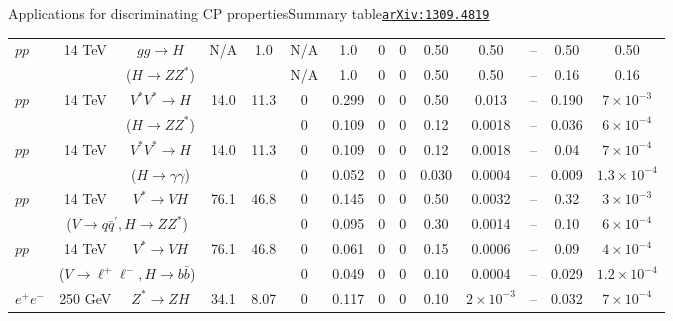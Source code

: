 \documentclass[usenames,dvipsnames,svgnames,table]{beamer}
\newcommand{\arxiv}[1]{\href{http://arxiv.org/abs/#1}{\nolinkurl{arXiv:#1}}}
\newcommand{\snowmass}{\arxiv{1309.4819}}
\begin{document}
\begin{frame}{Applications for discriminating CP properties}{Summary table\hfill\snowmass}
{\begin{tabular}{|lcccc || cccccc || cccc |}
\hline
\hline
$pp$ & 14 TeV &  $gg\to H$                        & N/A        &  1.0       &   N/A & 1.0 &  0 & 0 & 0.50 & 0.50 & \multicolumn{2}{c}{ --  } &  0.50 & 0.50 \\
          &               &   ($H\to ZZ^*$)              &            &               &  N/A & 1.0 &  0 & 0  & 0.50 & 0.50 & \multicolumn{2}{c}{ --  } & 0.16 & 0.16 \\
\hline
$pp$ & 14 TeV &  $V^*V^*\to H$                & 14.0     &  11.3    &  0 & 0.299      &  0 & 0 & 0.50 & 0.013  & \multicolumn{2}{c}{ --  } & 0.190 &$7\!\times\!10^{-3}$ \\
          &               &   ($H\to ZZ^*$)                &            &              &   0 & 0.109 &  0 & 0  & 0.12 & 0.0018 & \multicolumn{2}{c}{ --  } & 0.036 & $6\!\times\!10^{-4}$ \\
\hline
$pp$ & 14 TeV &  $V^*V^*\to H$                            & 14.0     &  11.3       & 0 & 0.109 &  0 & 0  & 0.12 & 0.0018 & \multicolumn{2}{c}{ --  }  & 0.04 & $7\!\times\!10^{-4}$  \\
          &               &   ($H\to\gamma\gamma$)             &           &                & 0 & 0.052 &  0 & 0  & 0.030 & 0.0004 & \multicolumn{2}{c}{ --  } &  0.009 & $1.3\!\times\!10^{-4}$\\
\hline
$pp$ & 14 TeV &  $V^*\to VH$                    &  76.1     &  46.8      & 0 & 0.145   & 0 & 0  & 0.50 & 0.0032  & \multicolumn{2}{c}{ --  }  & 0.32 & $3\!\times\!10^{-3}$  \\
          &              \multicolumn{2}{c}{($V\to q\bar{q}^\prime, H\to ZZ^*$)}
                                                                            &           &                & 0  & 0.095      &  0 & 0  & 0.30 & 0.0014 & \multicolumn{2}{c}{ --  } & 0.10 & $6\!\times\!10^{-4}$  \\
\hline
%
$pp$ & 14 TeV &  $V^*\to VH$                                                                   &  76.1   &  46.8      & 0 & 0.061 & 0 & 0  & 0.15 & 0.0006 & \multicolumn{2}{c}{ --  }  & 0.09  & $4\!\times\!10^{-4}$  \\
         &            \multicolumn{2}{c}{($V\to \ell^+\ell^-, H\to b\bar{b}$)}   &           &                 &  0 & 0.049 &  0 & 0  & 0.10 &  0.0004 & \multicolumn{2}{c}{ --  } & 0.029 & $1.2\!\times\!10^{-4}$  \\
\hline\hline
$e^+e^-$ & 250 GeV & $Z^*\to ZH$ & 34.1 &  8.07 & 0  & 0.117 & 0 & 0  & 0.10 & $2\times10^{-3}$ & \multicolumn{2}{c}{ --  } & 0.032 & $7\!\times\!10^{-4}$ \\

\end{tabular}}
\end{frame}
\end{document}

